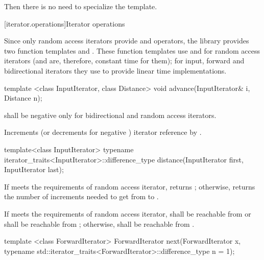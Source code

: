 \pnum
Then there is no need to specialize the
template.
\exitexample

[iterator.operations]{Iterator operations}

\pnum
Since only random access iterators provide
\tcode{+}
and
\tcode{-}
operators, the library provides two
function templates
and
.
These
function templates
use
\tcode{+}
and
\tcode{-}
for random access iterators (and are, therefore, constant
time for them); for input, forward and bidirectional iterators they use
\tcode{++}
to provide linear time
implementations.

%
\begin{itemdecl}
template <class InputIterator, class Distance>
  void advance(InputIterator& i, Distance n);
\end{itemdecl}

\begin{itemdescr}
\pnum
\requires
{}
shall be negative only for bidirectional and random access iterators.

\pnum
\effects
Increments (or decrements for negative
)
iterator reference
by
.
\end{itemdescr}

%
\begin{itemdecl}
  template<class InputIterator>
      typename iterator_traits<InputIterator>::difference_type
         distance(InputIterator first, InputIterator last);
\end{itemdecl}

\begin{itemdescr}
\pnum
\effects
If  meets the requirements of random access iterator,
returns ; otherwise, returns
the number of increments needed to get from
to
.

\pnum
\requires
If  meets the requirements of random access iterator,
 shall be reachable from  or  shall be
reachable from ; otherwise,
shall be reachable from
.
\end{itemdescr}

%
\begin{itemdecl}
template <class ForwardIterator>
  ForwardIterator next(ForwardIterator x,
    typename std::iterator_traits<ForwardIterator>::difference_type n = 1);
\end{itemdecl}

